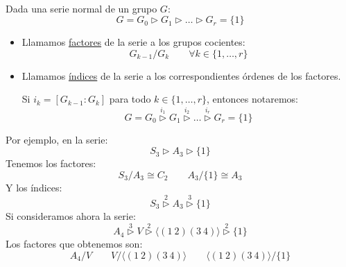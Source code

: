 \begin{definicion}\ \\
    Dada una serie normal de un grupo $G$:
    \begin{equation*}
        G = G_0 \rhd G_1 \rhd \ldots \rhd G_r = \{1\}
    \end{equation*}
    \begin{itemize}
        \item Llamamos \underline{factores} de la serie a los grupos cocientes:
            \begin{equation*}
                G_{k-1}/G_k \qquad \forall k\in \{1,\ldots,r\}
            \end{equation*}
        \item Llamamos \underline{índices} de la serie a los correspondientes órdenes de los factores. 
           
            Si $i_k = [G_{k-1} : G_k]$ para todo $k \in \{1,\ldots,r\}$, entonces notaremos:
            \begin{equation*}
                G = G_0 \stackrel{i_1}{\rhd} G_1 \stackrel{i_2}{\rhd} \ldots \stackrel{i_r}{\rhd} G_r = \{1\}
            \end{equation*}
    \end{itemize}
\end{definicion}

\begin{ejemplo}
    Por ejemplo, en la serie:
    \begin{equation*}
        S_3 \rhd A_3 \rhd \{1\}
    \end{equation*}
    Tenemos los factores:
    \begin{equation*}
        S_3/A_3 \cong C_2 \qquad 
        A_3/\{1\} \cong A_3
    \end{equation*}
    Y los índices:
    \begin{equation*}
        S_3 \stackrel{2}{\rhd} A_3 \stackrel{3}{\rhd} \{1\}
    \end{equation*}
    Si consideramos ahora la serie:
    \begin{equation*}
        A_4 \stackrel{3}{\rhd} V \stackrel{2}{\rhd} \langle (1\ 2)(3\ 4) \rangle \stackrel{2}{\rhd} \{1\}
    \end{equation*}
    Los factores que obtenemos son:
    \begin{equation*}
        A_4/V \qquad V/\langle (1\ 2)(3\ 4) \rangle \qquad \langle (1\ 2)(3\ 4) \rangle /\{1\}
    \end{equation*}
\end{ejemplo}

